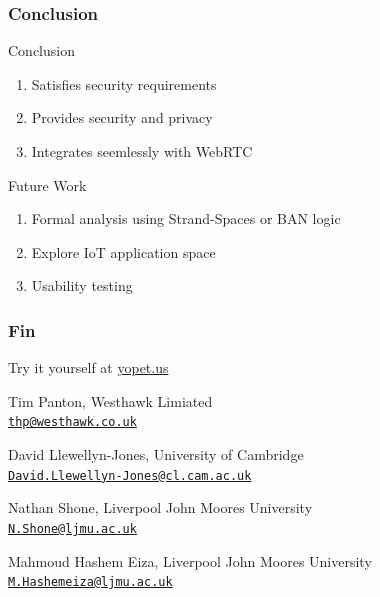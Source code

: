 \documentclass[handout, notes=hide]{beamer}
\newcommand{\emaillink}[1]{\href{mailto:#1}{\nolinkurl{#1}}}
\begin{document}
\begin{frame}
\frametitle{Conclusion}
\setlength{\parskip}{0.5em}

Conclusion
\begin{enumerate}
\item Satisfies security requirements
\item Provides security and privacy
\item Integrates seemlessly with WebRTC
\end{enumerate}

Future Work
\begin{enumerate}
\item Formal analysis using Strand-Spaces or BAN logic
\item Explore IoT application space
\item Usability testing
\end{enumerate}

\end{frame}


\begin{frame}
\frametitle{Fin}
Try it yourself at \url{yopet.us}
\setlength{\parskip}{1.0em}

Tim Panton, Westhawk Limiated \\
\emaillink{thp@westhawk.co.uk}

David Llewellyn-Jones, University of Cambridge \\
\emaillink{David.Llewellyn-Jones@cl.cam.ac.uk}

Nathan Shone, Liverpool John Moores University \\
\emaillink{N.Shone@ljmu.ac.uk}

Mahmoud Hashem Eiza, Liverpool John Moores University \\
\emaillink{M.Hashemeiza@ljmu.ac.uk}

\end{frame}


%
%

\end{document}

